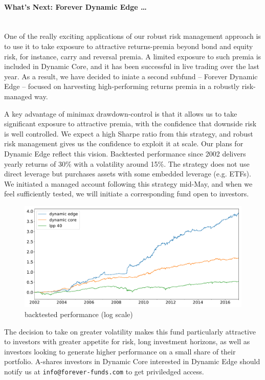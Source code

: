 \documentclass[letterpaper,12pt]{article}
\begin{document}
 
\paragraph{What's Next: Forever Dynamic Edge \ldots} $ $\\
One of the really exciting applications of our robust risk management approach is to use it to take exposure to attractive returns-premia beyond bond and equity risk, for instance, carry and reversal premia. A limited exposure to such premia is included in Dynamic Core, and it has been successful in live trading over the last year. As a result, we have decided to iniate a second subfund -- Forever Dynamic Edge -- focused on harvesting high-performing returns premia in a robustly risk-managed way. 

A key advantage of minimax drawdown-control is that it allows us to take significant exposure to attractive premia, with the confidence that downside risk is well controlled. We expect a high Sharpe ratio from this strategy, and robust risk management gives us the confidence to exploit it at scale. Our plans for Dynamic Edge reflect this vision.  Backtested performance since 2002 delivers yearly returns of 30\% with a volatility around 15\%. The strategy does not use direct leverage but purchases assets with some embedded leverage (e.g. ETFs). We initiated a managed account following this strategy mid-May, and when we feel sufficiently tested, we will initiate a corresponding fund open to investors. 
\begin{figure}[!ht]
\centering
\includegraphics[width=.8\textwidth]{backtest_edge.png}
\caption{backtested performance (log scale)}
\end{figure}
The decision to take on greater volatility makes this fund particularly attractive to investors with greater appetite for risk, long investment horizons, as well as investors looking to generate higher performance on a small share of their portfolio. A-shares investors in Dynamic Core interested in Dynamic Edge should notify us at \texttt{info@forever-funds.com} to get priviledged access.
\end{document}
